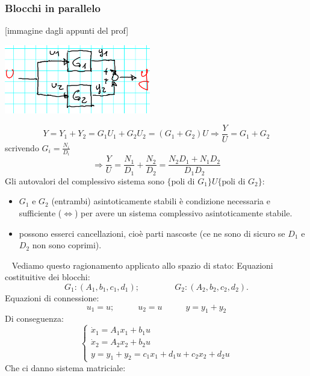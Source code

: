 \subsubsection{Blocchi in parallelo}
[immagine dagli appunti del prof]
\begin{center}
    \includegraphics[height=3cm]{../lezione11/img4.PNG}
\end{center}
\[
    Y = Y_1 + Y_2 = G_1 U_1 + G_2 U_2 = (G_1 + G_2)U \Longrightarrow \frac{Y}{U} = G_1 +G_2
\]
scrivendo $G_i= \frac{N_i}{D_i}$
\[
    \Longrightarrow \frac{Y}{U} = \frac{N_1}{D_1} + \frac{N_2}{D_2} = \frac{N_2 D_1 + N_1 D_2}{D_1D_2}
\]
Gli autovalori del complessivo sistema sono $\{\text{poli di $G_1$}\} U \{\text{poli di $G_2$}\}$:
\begin{itemize}
    \item $G_1$ e $G_2$ (entrambi) asintoticamente stabili è condizione necessaria e sufficiente ($\Leftrightarrow$) per avere un sistema complessivo asintoticamente stabile.
    \item possono esserci cancellazioni, cioè parti nascoste (ce ne sono di sicuro se $D_1$ e $D_2$ non sono coprimi).
\end{itemize}
\ \newline
Vediamo questo ragionamento applicato allo spazio di stato:\newline
Equazioni costituitive dei blocchi:
\[
    G_1 : (A_1, b_1, c_1,d_1); \;\;\;\;\;\;\;\;\;\;\;\;\;\;\; G_2 : (A_2, b_2,c_2,d_2).
\]
Equazioni di connessione:
\[
    u_1 = u; \;\;\;\;\;\;\;\;\;\; u_2 = u \;\;\;\;\;\;\;\;\;\; y=y_1 + y_2
\]
Di conseguenza:
\[
    \begin{cases}
        \dot{x}_1 = A_1 x_1 + b_1 u\\
        \dot{x}_2 = A_2 x_2 + b_2 u\\
        y = y_1 + y_2 = c_1 x_1 + d_1 u + c_2 x_2 + d_2 u
    \end{cases}
\]
Che ci danno sistema matriciale:
